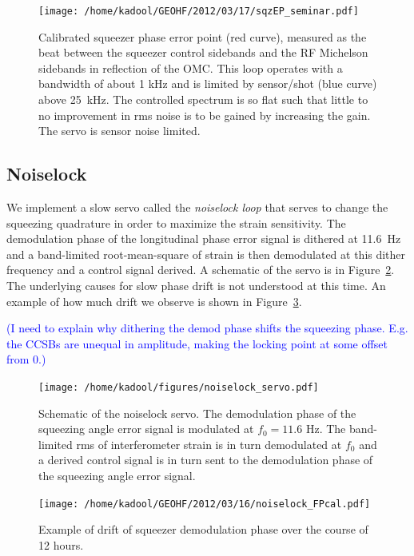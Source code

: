 \documentclass{ligodoc}
\begin{document}
\begin{figure}
\begin{centering}
\texttt{[image: /home/kadool/GEOHF/2012/03/17/sqzEP\_seminar.pdf]}
\caption{Calibrated squeezer phase error point (red curve), measured
  as the beat between the squeezer control sidebands and the RF
  Michelson sidebands in reflection of the OMC. This loop operates
  with a bandwidth of about 1 kHz and is limited by sensor/shot (blue
  curve) above 25~kHz. The controlled spectrum is so flat such that
  little to no improvement in rms noise is to be gained by increasing
  the gain. The servo is sensor noise limited.}
\label{fig:sqzEP}
\end{centering}
\end{figure}





\subsection{Noiselock}
We implement a slow servo called the \emph{noiselock loop} that serves
to change the squeezing quadrature in order to maximize the strain
sensitivity. The demodulation phase of the longitudinal phase error
signal is dithered at 11.6~Hz and a band-limited root-mean-square of
strain is then demodulated at this dither frequency and a control
signal derived. A schematic of the servo is in
Figure~\ref{fig:noiselockservo}. The underlying causes for slow phase
drift is not understood at this time. An example of how much drift we
observe is shown in Figure~\ref{fig:noiselock}. 

\textcolor{blue}{(I need to explain why dithering the demod phase
  shifts the squeezing phase. E.g. the CCSBs are unequal in amplitude,
  making the locking point at some offset from 0.)}

\begin{figure}
\begin{centering}
\texttt{[image: /home/kadool/figures/noiselock\_servo.pdf]}
\caption{Schematic of the noiselock servo. The demodulation phase of
  the squeezing angle error signal is modulated at $f_0=11.6$ Hz. The
  band-limited rms of interferometer strain is in turn demodulated at
  $f_0$ and a derived control signal is in turn sent to the
  demodulation phase of the squeezing angle error signal.}
\label{fig:noiselockservo}
\end{centering}
\end{figure}


\begin{figure}
\begin{centering}
\texttt{[image: /home/kadool/GEOHF/2012/03/16/noiselock\_FPcal.pdf]}
\caption{Example of drift of squeezer demodulation phase over the
  course of 12 hours.}
\label{fig:noiselock}
\end{centering}
\end{figure}
\end{document}
